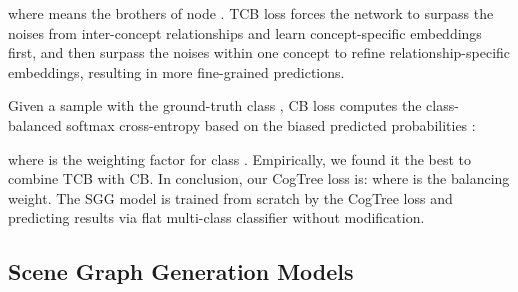 \documentclass{article}
\begin{document}
\fi

where  means the brothers of node . TCB loss  forces  the  network  to  surpass  the  noises from inter-concept relationships and learn concept-specific embeddings first, and then surpass  the  noises within one concept to refine relationship-specific embeddings,  resulting in more fine-grained predictions. 

Given a sample with the ground-truth class , CB loss computes the class-balanced softmax cross-entropy based on the biased predicted probabilities : 

where  is the weighting factor \cite{Cui2019Class} for class . Empirically, we found it the best to combine TCB with CB. In conclusion, our CogTree loss is: 
where  is the balancing weight. The SGG model is trained from scratch by the CogTree loss and predicting results via flat multi-class classifier without modification. 








\subsection{Scene Graph Generation Models}
\label{ssec:biasedModel}
\end{document}

